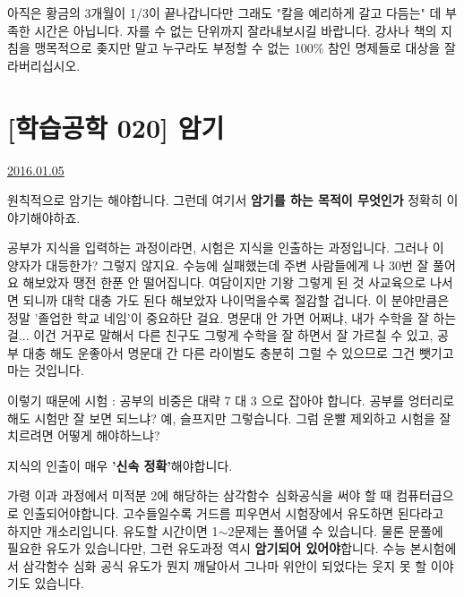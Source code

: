 아직은 황금의 3개월이 1/3이 끝나갑니다만 그래도 "칼을 예리하게 갈고 다듬는" 데 부족한 시간은 아닙니다.
자를 수 없는 단위까지 잘라내보시길 바랍니다. 강사나 책의 지침을 맹목적으로 좆지만 말고
누구라도 부정할 수 없는 100$\%$ 참인 명제들로 대상을 잘라버리십시오.
\vspace{5mm}




\section{[학습공학 020] 암기}
\href{https://www.kockoc.com/Apoc/576404}{2016.01.05}

\vspace{5mm}

원칙적으로 암기는 해야합니다.
그런데 여기서 \textbf{암기를 하는 목적이 무엇인가} 정확히 이야기해야하죠.
\vspace{5mm}

공부가 지식을 입력하는 과정이라면, 시험은 지식을 인출하는 과정입니다.
그러나 이 양자가 대등한가? 그렇지 않지요.
수능에 실패했는데 주변 사람들에게 나 30번 잘 풀어요 해보았자 땡전 한푼 안 떨어집니다.
여담이지만 기왕 그렇게 된 것 사교육으로 나서면 되니까 대학 대충 가도 된다 해보았자 나이먹을수록 절감할 겁니다.
이 분야만큼은 정말 '졸업한 학교 네임'이 중요하단 걸요.
명문대 안 가면 어쩌냐, 내가 수학을 잘 하는 걸... 이건 거꾸로 말해서 다른 친구도 그렇게 수학을 잘 하면서 잘 가르칠 수 있고,
공부 대충 해도 운좋아서 명문대 간 다른 라이벌도 충분히 그럴 수 있으므로 그건 뺏기고 마는 것입니다.
\vspace{5mm}

이렇기 때문에 시험 : 공부의 비중은 대략 7 대 3 으로 잡아야 합니다.
공부를 엉터리로 해도 시험만 잘 보면 되느냐? 예, 슬프지만 그렇습니다.
그럼 운빨 제외하고 시험을 잘 치르려면 어떻게 해야하느냐?
\vspace{5mm}

지식의 인출이 매우 \textbf{'신속 정확'}해야합니다.
\vspace{5mm}

가령 이과 과정에서 미적분 2에 해당하는 삼각함수 심화공식을 써야 할 때 컴퓨터급으로 인출되어야합니다.
고수들일수록 거드름 피우면서 시험장에서 유도하면 된다라고 하지만 개소리입니다. 유도할 시간이면 1$\sim$2문제는 풀어댈 수 있습니다.
물론 문풀에 필요한 유도가 있습니다만, 그런 유도과정 역시 \textbf{암기되어 있어야}합니다.
수능 본시험에서 삼각함수 심화 공식 유도가 뭔지 깨달아서 그나마 위안이 되었다는 웃지 못 할 이야기도 있습니다.
\vspace{5mm}

